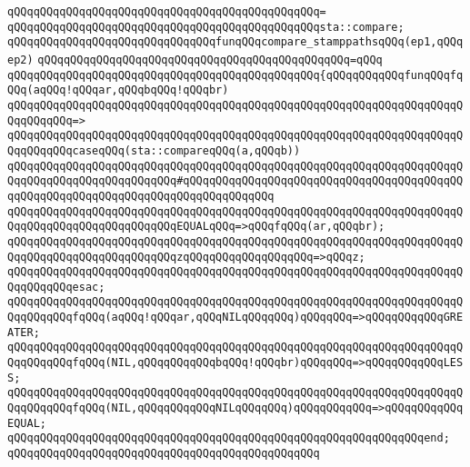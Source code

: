 \verb|qQQqqQQqqQQqqQQqqQQqqQQqqQQqqQQqqQQqqQQqqQQqqQQq=|\newline
\verb|qQQqqQQqqQQqqQQqqQQqqQQqqQQqqQQqqQQqqQQqqQQqqQQqsta::compare;|\newline
\newline
\verb|qQQqqQQqqQQqqQQqqQQqqQQqqQQqqQQqfunqQQqcompare_stamppathsqQQq(ep1,qQQqep2)|\newline
\verb|qQQqqQQqqQQqqQQqqQQqqQQqqQQqqQQqqQQqqQQqqQQqqQQq=qQQq|\newline
\verb|qQQqqQQqqQQqqQQqqQQqqQQqqQQqqQQqqQQqqQQqqQQqqQQq{qQQqqQQqqQQqfunqQQqfqQQq(aqQQq!qQQqar,qQQqbqQQq!qQQqbr)|\newline
\verb|qQQqqQQqqQQqqQQqqQQqqQQqqQQqqQQqqQQqqQQqqQQqqQQqqQQqqQQqqQQqqQQqqQQqqQQqqQQqqQQq=>|\newline
\verb|qQQqqQQqqQQqqQQqqQQqqQQqqQQqqQQqqQQqqQQqqQQqqQQqqQQqqQQqqQQqqQQqqQQqqQQqqQQqqQQqcaseqQQq(sta::compareqQQq(a,qQQqb))|\newline
\verb|qQQqqQQqqQQqqQQqqQQqqQQqqQQqqQQqqQQqqQQqqQQqqQQqqQQqqQQqqQQqqQQqqQQqqQQqqQQqqQQqqQQqqQQqqQQqqQQq#qQQqqQQqqQQqqQQqqQQqqQQqqQQqqQQqqQQqqQQqqQQqqQQqqQQqqQQqqQQqqQQqqQQqqQQqqQQqqQQqqQQq|\newline
\verb|qQQqqQQqqQQqqQQqqQQqqQQqqQQqqQQqqQQqqQQqqQQqqQQqqQQqqQQqqQQqqQQqqQQqqQQqqQQqqQQqqQQqqQQqqQQqqQQqEQUALqQQq=>qQQqfqQQq(ar,qQQqbr);|\newline
\verb|qQQqqQQqqQQqqQQqqQQqqQQqqQQqqQQqqQQqqQQqqQQqqQQqqQQqqQQqqQQqqQQqqQQqqQQqqQQqqQQqqQQqqQQqqQQqqQQqzqQQqqQQqqQQqqQQqqQQq=>qQQqz;|\newline
\verb|qQQqqQQqqQQqqQQqqQQqqQQqqQQqqQQqqQQqqQQqqQQqqQQqqQQqqQQqqQQqqQQqqQQqqQQqqQQqqQQqesac;|\newline
\newline
\verb|qQQqqQQqqQQqqQQqqQQqqQQqqQQqqQQqqQQqqQQqqQQqqQQqqQQqqQQqqQQqqQQqqQQqqQQqqQQqqQQqfqQQq(aqQQq!qQQqar,qQQqNILqQQqqQQq)qQQqqQQq=>qQQqqQQqqQQqGREATER;|\newline
\verb|qQQqqQQqqQQqqQQqqQQqqQQqqQQqqQQqqQQqqQQqqQQqqQQqqQQqqQQqqQQqqQQqqQQqqQQqqQQqqQQqfqQQq(NIL,qQQqqQQqqQQqbqQQq!qQQqbr)qQQqqQQq=>qQQqqQQqqQQqLESS;|\newline
\verb|qQQqqQQqqQQqqQQqqQQqqQQqqQQqqQQqqQQqqQQqqQQqqQQqqQQqqQQqqQQqqQQqqQQqqQQqqQQqqQQqfqQQq(NIL,qQQqqQQqqQQqNILqQQqqQQq)qQQqqQQqqQQq=>qQQqqQQqqQQqEQUAL;|\newline
\verb|qQQqqQQqqQQqqQQqqQQqqQQqqQQqqQQqqQQqqQQqqQQqqQQqqQQqqQQqqQQqqQQqend;|\newline
\verb|qQQqqQQqqQQqqQQqqQQqqQQqqQQqqQQqqQQqqQQqqQQqqQQq|\newline
